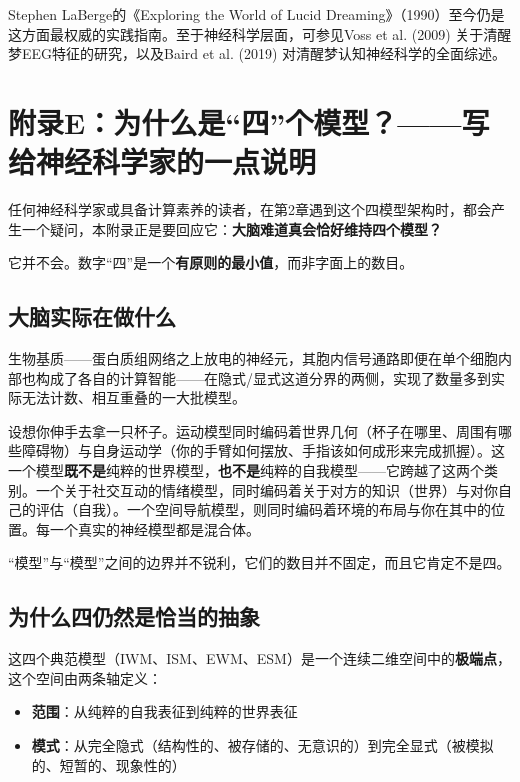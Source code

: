 \documentclass[11pt, twoside, openright]{book}
\begin{document}
Stephen LaBerge的《Exploring the World of Lucid Dreaming》（1990）至今仍是这方面最权威的实践指南。至于神经科学层面，可参见Voss et al. (2009) 关于清醒梦EEG特征的研究，以及Baird et al. (2019) 对清醒梦认知神经科学的全面综述。


\chapter*{附录E：为什么是“四”个模型？------写给神经科学家的一点说明}

任何神经科学家或具备计算素养的读者，在第2章遇到这个四模型架构时，都会产生一个疑问，本附录正是要回应它：\textbf{大脑难道真会恰好维持四个模型？}

它并不会。数字“四”是一个\textbf{有原则的最小值}，而非字面上的数目。

\section*{大脑实际在做什么}

生物基质------蛋白质组网络之上放电的神经元，其胞内信号通路即便在单个细胞内部也构成了各自的计算智能------在隐式/显式这道分界的两侧，实现了数量多到实际无法计数、相互重叠的一大批模型。

设想你伸手去拿一只杯子。运动模型同时编码着世界几何（杯子在哪里、周围有哪些障碍物）与自身运动学（你的手臂如何摆放、手指该如何成形来完成抓握）。这一个模型\textbf{既不是}纯粹的世界模型，\textbf{也不是}纯粹的自我模型------它跨越了这两个类别。一个关于社交互动的情绪模型，同时编码着关于对方的知识（世界）与对你自己的评估（自我）。一个空间导航模型，则同时编码着环境的布局与你在其中的位置。每一个真实的神经模型都是混合体。

“模型”与“模型”之间的边界并不锐利，它们的数目并不固定，而且它肯定不是四。

\section*{为什么四仍然是恰当的抽象}

这四个典范模型（IWM、ISM、EWM、ESM）是一个连续二维空间中的\textbf{极端点}，这个空间由两条轴定义：

\begin{itemize}
  \item \textbf{范围}：从纯粹的自我表征到纯粹的世界表征
  \item \textbf{模式}：从完全隐式（结构性的、被存储的、无意识的）到完全显式（被模拟的、短暂的、现象性的）
\end{itemize}
\end{document}
